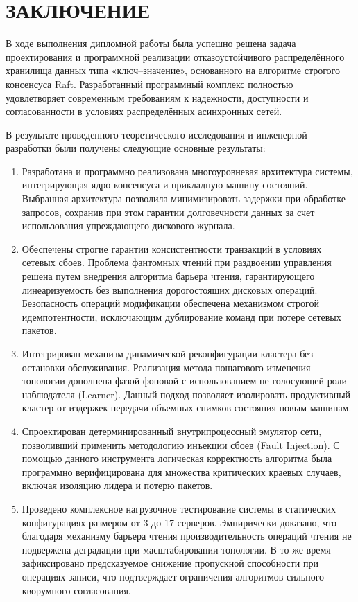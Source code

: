 \chapter*{ЗАКЛЮЧЕНИЕ}

В ходе выполнения дипломной работы была успешно решена задача проектирования и программной реализации отказоустойчивого распределённого хранилища данных типа «ключ--значение», основанного на алгоритме строгого консенсуса Raft. Разработанный программный комплекс полностью удовлетворяет современным требованиям к надежности, доступности и согласованности в условиях распределённых асинхронных сетей.

В результате проведенного теоретического исследования и инженерной разработки были получены следующие основные результаты:

\begin{enumerate}
    \item Разработана и программно реализована многоуровневая архитектура системы, интегрирующая ядро консенсуса и прикладную машину состояний. Выбранная архитектура позволила минимизировать задержки при обработке запросов, сохранив при этом гарантии долговечности данных за счет использования упреждающего дискового журнала.
    
    \item Обеспечены строгие гарантии консистентности транзакций в условиях сетевых сбоев. Проблема фантомных чтений при раздвоении управления решена путем внедрения алгоритма барьера чтения, гарантирующего линеаризуемость без выполнения дорогостоящих дисковых операций. Безопасность операций модификации обеспечена механизмом строгой идемпотентности, исключающим дублирование команд при потере сетевых пакетов.
    
    \item Интегрирован механизм динамической реконфигурации кластера без остановки обслуживания. Реализация метода пошагового изменения топологии дополнена фазой фоновой с использованием не голосующей роли наблюдателя (Learner). Данный подход позволяет изолировать продуктивный кластер от издержек передачи объемных снимков состояния новым машинам.
    
    \item Спроектирован детерминированный внутрипроцессный эмулятор сети, позволивший применить методологию инъекции сбоев (Fault Injection). С помощью данного инструмента логическая корректность алгоритма была программно верифицирована для множества критических краевых случаев, включая изоляцию лидера и потерю пакетов.
    
    \item Проведено комплексное нагрузочное тестирование системы в статических конфигурациях размером от 3 до 17 серверов. Эмпирически доказано, что благодаря механизму барьера чтения производительность операций чтения не подвержена деградации при масштабировании топологии. В то же время зафиксировано предсказуемое снижение пропускной способности при операциях записи, что подтверждает ограничения алгоритмов сильного кворумного согласования.
\end{enumerate}

